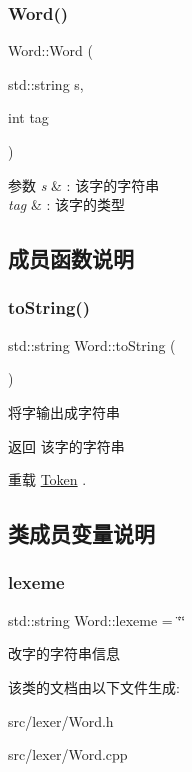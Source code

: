 \subsubsection{\texorpdfstring{Word()}{Word()}}
{\footnotesize\ttfamily Word\+::\+Word (\begin{DoxyParamCaption}\item[{std\+::string}]{s,  }\item[{int}]{tag }\end{DoxyParamCaption})}


\begin{DoxyParams}{参数}
{\em s} & \+: 该字的字符串 \\
\hline
{\em tag} & \+: 该字的类型 \\
\hline
\end{DoxyParams}


\subsection{成员函数说明}
\mbox{\label{class_word_a950a81bfd0fc369b0eb8d0d6b27e2870}} 
\subsubsection{\texorpdfstring{to\+String()}{toString()}}
{\footnotesize\ttfamily std\+::string Word\+::to\+String (\begin{DoxyParamCaption}{ }\end{DoxyParamCaption})\hspace{0.3cm}{\ttfamily [virtual]}}

将字输出成字符串 \begin{DoxyReturn}{返回}
该字的字符串 
\end{DoxyReturn}


重载 \hyperlink{class_token_a8863381edabce7bc1e92473b445ba81f}{Token} .



\subsection{类成员变量说明}
\mbox{\label{class_word_a34691d869ec57b2a0b7a8eb41230b92a}} 
\subsubsection{\texorpdfstring{lexeme}{lexeme}}
{\footnotesize\ttfamily std\+::string Word\+::lexeme = \char`\"{}\char`\"{}}

改字的字符串信息 

该类的文档由以下文件生成\+:\begin{DoxyCompactItemize}
\item 
src/lexer/Word.\+h\item 
src/lexer/Word.\+cpp\end{DoxyCompactItemize}
